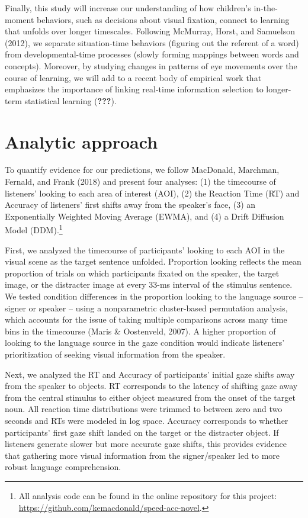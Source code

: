 \documentclass[man,floatsintext]{apa6}
\let\rmarkdownfootnote\footnote%
\def\footnote{\protect\rmarkdownfootnote}
\begin{document}
Finally, this study will increase our understanding of how children's
in-the-moment behaviors, such as decisions about visual fixation,
connect to learning that unfolds over longer timescales. Following
McMurray, Horst, and Samuelson (2012), we separate situation-time
behaviors (figuring out the referent of a word) from developmental-time
processes (slowly forming mappings between words and concepts).
Moreover, by studying changes in patterns of eye movements over the
course of learning, we will add to a recent body of empirical work that
emphasizes the importance of linking real-time information selection to
longer-term statistical learning ({\textbf{???}}).

\section{Analytic approach}\label{analytic-approach}

To quantify evidence for our predictions, we follow MacDonald, Marchman,
Fernald, and Frank (2018) and present four analyses: (1) the timecourse
of listeners' looking to each area of interest (AOI), (2) the Reaction
Time (RT) and Accuracy of listeners' first shifts away from the
speaker's face, (3) an Exponentially Weighted Moving Average (EWMA), and
(4) a Drift Diffusion Model (DDM).\footnote{All analysis code can be
  found in the online repository for this project:
  \url{https://github.com/kemacdonald/speed-acc-novel}.}

First, we analyzed the timecourse of participants' looking to each AOI
in the visual scene as the target sentence unfolded. Proportion looking
reflects the mean proportion of trials on which participants fixated on
the speaker, the target image, or the distracter image at every 33-ms
interval of the stimulus sentence. We tested condition differences in
the proportion looking to the language source -- signer or speaker --
using a nonparametric cluster-based permutation analysis, which accounts
for the issue of taking multiple comparisons across many time bins in
the timecourse (Maris \& Oostenveld, 2007). A higher proportion of
looking to the language source in the gaze condition would indicate
listeners' prioritization of seeking visual information from the
speaker.

Next, we analyzed the RT and Accuracy of participants' initial gaze
shifts away from the speaker to objects. RT corresponds to the latency
of shifting gaze away from the central stimulus to either object
measured from the onset of the target noun. All reaction time
distributions were trimmed to between zero and two seconds and RTs were
modeled in log space. Accuracy corresponds to whether participants'
first gaze shift landed on the target or the distracter object. If
listeners generate slower but more accurate gaze shifts, this provides
evidence that gathering more visual information from the signer/speaker
led to more robust language comprehension.
\end{document}
